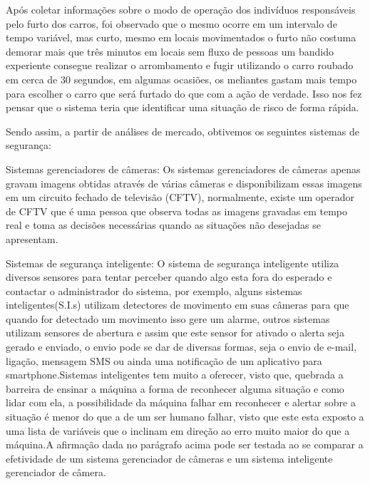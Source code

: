 
    Após coletar informações sobre o modo de operação dos indivíduos responsáveis pelo furto dos carros, foi observado que o mesmo ocorre em um intervalo de tempo variável, mas curto, mesmo em locais movimentados o furto não costuma demorar mais que três minutos em locais sem fluxo de pessoas um bandido experiente consegue realizar o arrombamento e  fugir utilizando o carro roubado em cerca de 30 segundos, em algumas ocasiões, os meliantes gastam mais tempo para escolher o carro que será furtado do que com a ação de verdade. Isso nos fez pensar que o sistema teria que identificar uma situação de risco de forma rápida.
    
    Sendo assim, a partir de análises de mercado, obtivemos os seguintes sistemas de segurança:
    
    \bullet Sistemas gerenciadores de câmeras: Os sistemas gerenciadores de câmeras apenas gravam imagens obtidas através de várias câmeras e disponibilizam essas imagens em um circuito fechado de televisão (CFTV), normalmente, existe um operador de CFTV que é uma pessoa que observa todas as imagens gravadas em tempo real e toma as decisões necessárias quando as situações não desejadas se apresentam.
    
    \bullet Sistemas de segurança inteligente: O sistema de segurança inteligente utiliza diversos sensores para tentar perceber quando algo esta fora do esperado e contactar o administrador do sistema, por exemplo, alguns sistemas inteligentes(S.I.s) utilizam detectores de movimento em suas câmeras para que quando for detectado um movimento isso gere um alarme, outros sistemas utilizam sensores de abertura e assim que este sensor for ativado o alerta seja gerado e enviado, o envio pode se dar de diversas formas, seja o envio de e-mail, ligação, mensagem SMS ou ainda uma notificação de um aplicativo para smartphone.Sistemas inteligentes tem muito a oferecer, visto que, quebrada a barreira de ensinar a máquina a forma de reconhecer alguma situação e como lidar com ela, a possibilidade da máquina falhar em reconhecer e alertar sobre a situação é menor do que a de um ser humano falhar, visto que este esta exposto a uma lista de variáveis que o inclinam em direção ao erro muito maior do que a máquina.A afirmação dada no parágrafo acima pode ser testada ao se comparar a efetividade de um sistema gerenciador de câmeras e um sistema inteligente gerenciador de câmera.


